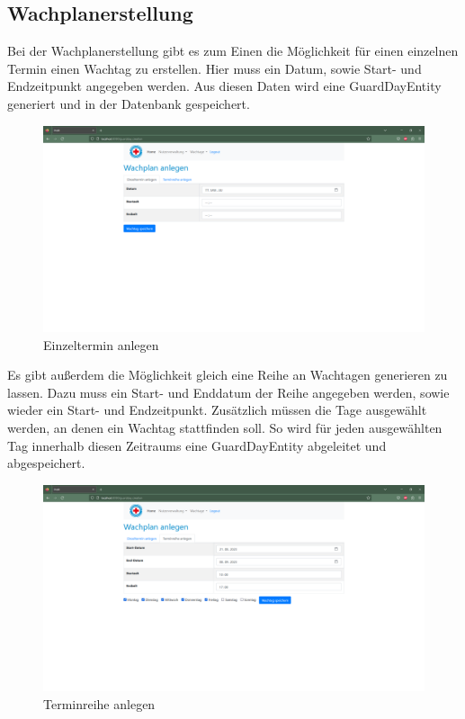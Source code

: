 \documentclass[fontsize=12pt,openright,oneside,paper=a4,BCOR=1cm]{scrbook}
\begin{document}
\subsection{Wachplanerstellung}

Bei der Wachplanerstellung gibt es zum Einen die M\"oglichkeit f\"ur einen einzelnen Termin einen Wachtag zu erstellen. Hier muss ein Datum, sowie Start- und Endzeitpunkt angegeben werden. Aus diesen Daten wird eine \glqq GuardDayEntity\grqq{} generiert und in der Datenbank gespeichert. 

\begin{figure}[H]
  \centering
    \includegraphics[width=0.7\linewidth]{Anlagen/Anwendung/6WachplananlegenSingle.png}
    \caption{Einzeltermin anlegen}
  \label{fig:anwendung-wachplanSingle}
\end{figure}

Es gibt au{\ss}erdem die M\"oglichkeit gleich eine Reihe an Wachtagen generieren zu lassen. Dazu muss ein Start- und Enddatum der Reihe angegeben werden, sowie wieder ein Start- und Endzeitpunkt. Zus\"atzlich m\"ussen die Tage ausgew\"ahlt werden, an denen ein Wachtag stattfinden soll. So wird f\"ur jeden ausgew\"ahlten Tag innerhalb diesen Zeitraums eine \glqq GuardDayEntity\grqq{} abgeleitet und abgespeichert.

\begin{figure}[H]
  \centering
    \includegraphics[width=0.7\linewidth]{Anlagen/Anwendung/6WachplananlegenMultipleBefullt.png}
    \caption{Terminreihe anlegen}
  \label{fig:anwendung-wachplanMultiple}
\end{figure}
\end{document}
